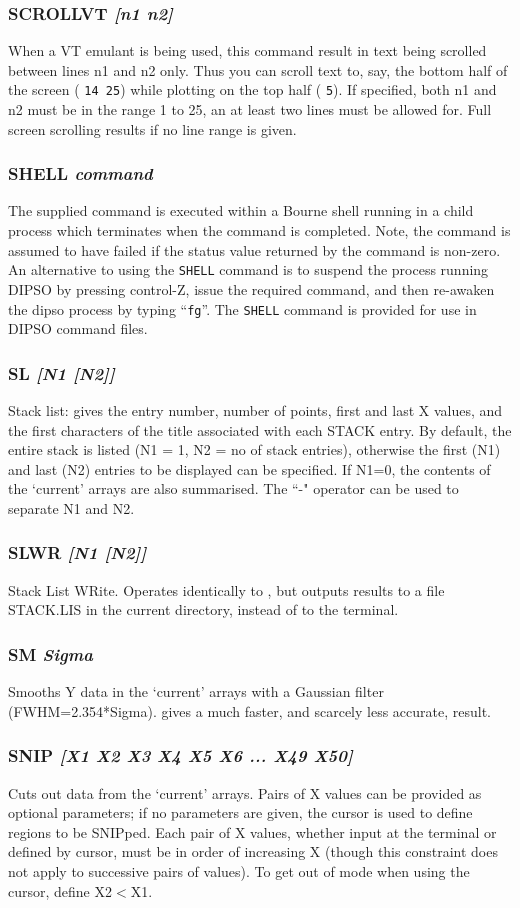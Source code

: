 \documentclass[twoside,11pt,noabs,nolof]{starlink}
\providecommand{\dipcom}[3]{\subsubsection*{\label{COM:#1}\xlabel{COM:#1}\textbf{#1} \emph{#2}}}
\begin{document}
\dipcom{SCROLLVT}{[n1 n2]}{Causes text to be scrolled between specified lines}
When a VT emulant is being used, this command result in text being
scrolled between lines n1 and n2 only. Thus you can scroll text to,
say, the bottom half of the screen
( \texttt{14 25}) while plotting on
the top half ( \texttt{5}). If specified, both n1 and n2 must be in the
range 1 to 25, an at least two lines must be allowed for. Full screen
scrolling results if no line range is given.

\dipcom{SHELL}{command}{Executes a shell command}
The supplied command is executed within a Bourne shell running in a child
process which terminates when the command is completed. Note, the command
is assumed to have failed if the status value returned by the command is
non-zero. An alternative to using the \texttt{SHELL} command is to suspend
the process running DIPSO by pressing control-Z, issue the required
command, and then re-awaken the dipso process by typing ``\texttt{fg}''. The
\texttt{SHELL} command is provided for use in DIPSO command files.

\dipcom{SL}{[N1 [N2]]}{Lists the contents of the stack and current arrays}
Stack list: gives the entry number, number of points, first and last X
values, and the first characters of the title associated with each
STACK entry. By default, the entire stack is listed (N1 = 1, N2 = no
of stack entries), otherwise the first (N1) and last (N2) entries to
be displayed can be specified. If N1=0, the contents of the `current'
arrays are also summarised. The ``-" operator can be used to separate
N1 and N2.

\dipcom{SLWR}{[N1 [N2]]}{As {\texttt{SL}},  but writes the information to a text file}
Stack List WRite. Operates identically to ,  but outputs results to a
file STACK.LIS in the current directory, instead of to the terminal.

\dipcom{SM}{Sigma}{Applies Gaussian smoothing to an array}
Smooths Y data in the `current' arrays with a Gaussian filter
(FWHM=2.354*Sigma).   gives a much faster, and scarcely less
accurate, result.

\dipcom{SNIP}{[X1 X2 X3 X4 X5 X6 ... X49 X50]}{Cuts out data from the current arrays}
Cuts out data from the `current' arrays. Pairs of X values can be
provided as optional parameters; if no parameters are given, the
cursor is used to define regions to be SNIPped. Each pair of X values,
whether input at the terminal or defined by cursor, must be in order
of increasing X (though this constraint does not apply to successive
pairs of values). To get out of   mode when using the cursor,
define X2$<$X1.
\end{document}
